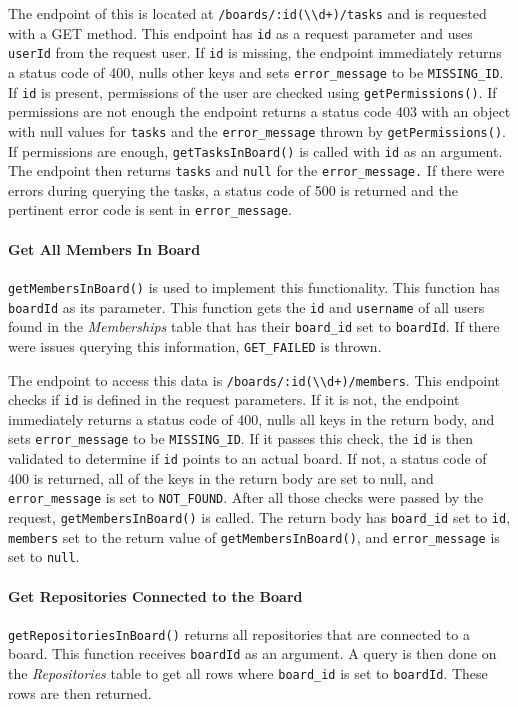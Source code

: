\documentclass{article}
\def\code#1{\texttt{#1}}
\begin{document}
The endpoint of this is located at
\code{/boards/:id(\textbackslash{}\textbackslash{}d+)/tasks} and is requested
with a GET method. This endpoint has \code{id} as a request parameter and uses
\code{userId} from the request user. If \code{id} is missing, the endpoint
immediately returns a status code of 400, nulls other keys and sets
\code{error\_message} to be \code{MISSING\_ID}. If \code{id} is present,
permissions of the user are checked using \code{getPermissions()}. If
permissions are not enough the endpoint returns a status code 403 with an object
with null values for \code{tasks} and the \code{error\_message} thrown by
\code{getPermissions()}. If permissions are enough, \code{getTasksInBoard()} is
called with \code{id} as an argument. The endpoint then returns \code{tasks} and
\code{null} for the \code{error\_message.} If there were errors during querying
the tasks, a status code of 500 is returned and the pertinent error code is sent
in \code{error\_message}.

\paragraph{Get All Members In Board}
\code{getMembersInBoard()} is used to implement this functionality. This
function has \code{boardId} as its parameter. This function gets the \code{id} and
\code{username} of all users found in the \emph{Memberships} table that has their \code{board\_id} set
to \code{boardId}. If there were issues querying this information, \code{GET\_FAILED} is
thrown.

The endpoint to access this data is
\code{/boards/:id(\textbackslash{}\textbackslash{}d+)/members}. This endpoint
checks if \code{id} is defined in the request parameters. If it is not, the
endpoint immediately returns a status code of 400, nulls all keys in the return
body, and sets \code{error\_message} to be \code{MISSING\_ID}. If it passes this
check, the \code{id} is then validated to determine if \code{id} points to an
actual board. If not, a status code of 400 is returned, all of the keys in the
return body are set to null, and \code{error\_message} is set to
\code{NOT\_FOUND}. After all those checks were passed by the request,
\code{getMembersInBoard()} is called. The return body has \code{board\_id} set
to \code{id}, \code{members} set to the return value of
\code{getMembersInBoard()}, and \code{error\_message} is set to \code{null}.

\paragraph{Get Repositories Connected to the Board}
\code{getRepositoriesInBoard()} returns all repositories that are connected to a
board. This function receives \code{boardId} as an argument. A query is then
done on the \emph{Repositories} table to get all rows where \code{board\_id} is
set to \code{boardId}. These rows are then returned.
\end{document}
